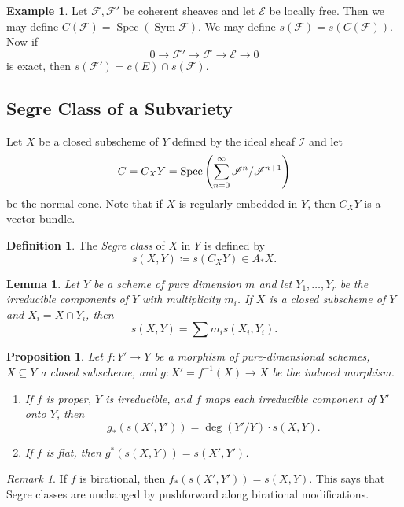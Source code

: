 \documentclass[leqno, openany]{memoir}
\newtheorem{prop}[thm]{Proposition}
\newtheorem{lem}[thm]{Lemma}
\theoremstyle{definition}
\newtheorem{defn}[thm]{Definition}
\newtheorem{exm}[thm]{Example}
\theoremstyle{remark}
\newtheorem{rmk}[thm]{Remark}
\theoremstyle{plain}
\theoremstyle{definition}
\theoremstyle{remark}
\newcommand{\msc}[1]{\mathscr{#1}}
\DeclareMathOperator{\Spec}{Spec}
\begin{document}
\begin{exm}
    Let $\msc{F}, \msc{F'}$ be coherent sheaves and let $\msc{E}$ be locally free. Then we may define $C(\msc{F}) = \Spec ( \operatorname{Sym} \msc{F} )$. We may define $s(\msc{F}) = s(C(\msc{F}))$. Now if 
    \[ 0 \to \msc{F}' \to \msc{F} \to \msc{E} \to 0 \]
    is exact, then $s(\msc{F'}) = c(E) \cap s(\msc{F})$.
\end{exm}

\subsection{Segre Class of a Subvariety}%
\label{sub:segre_class_of_a_subvariety}

Let $X$ be a closed subscheme of $Y$ defined by the ideal sheaf $\msc{I}$ and let
\[ C = C_X Y = \Spec \qty( \sum_{n=0}^{\infty} \msc{I}^n / \msc{I}^{n+1} ) \]
be the normal cone. Note that if $X$ is regularly embedded in $Y$, then $C_X Y$ is a vector bundle.

\begin{defn}
    The \textit{Segre class} of $X$ in $Y$ is defined by
    \[ s(X,Y) \coloneqq s(C_X Y) \in A_* X. \]
\end{defn}

\begin{lem}
    Let $Y$ be a scheme of pure dimension $m$ and let $Y_1, \ldots, Y_r$ be the irreducible components of $Y$ with multiplicity $m_i$. If $X$ is a closed subscheme of $Y$ and $X_i = X \cap Y_i$, then
    \[ s(X,Y) = \sum m_i s(X_i, Y_i). \]
\end{lem}

\begin{prop}
    Let $f \colon Y' \to Y$ be a morphism of pure-dimensional schemes, $X \subseteq Y$ a closed subscheme, and $g \colon X' = f^{-1}(X) \to X$ be the induced morphism.
    \begin{enumerate}
        \item If $f$ is proper, $Y$ is irreducible, and $f$ maps each irreducible component of $Y'$ onto $Y$, then
            \[ g_* (s(X', Y')) = \deg (Y'/Y) \cdot s(X,Y). \]
        \item If $f$ is flat, then $g^*(s(X,Y)) = s(X',Y')$.
    \end{enumerate}
\end{prop}

\begin{rmk}
    If $f$ is birational, then $f_* (s(X', Y')) = s(X,Y)$. This says that Segre classes are unchanged by pushforward along birational modifications.
\end{rmk}
\end{document}
